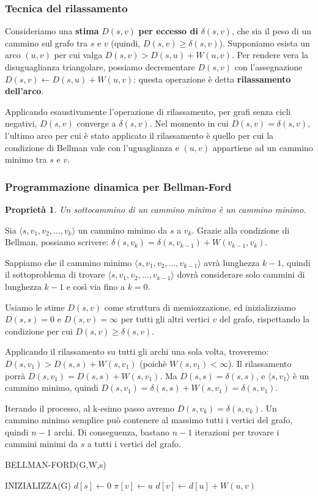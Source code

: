 \documentclass[11pt]{article}
\newtheorem*{proprietà}{Proprietà}
\begin{document}
\subsubsection{Tecnica del rilassamento}
Consideriamo una \textbf{stima} $D(s,v)$ \textbf{per eccesso di} $\delta(s,v)$, che sia il peso di un cammino sul grafo 
tra $s$ e $v$ (quindi, $D(s,v)\geq \delta(s,v)$).
Supponiamo esista un arco $(u,v)$ per cui valga $D(s,v)>D(s,u)+W(u,v)$. Per rendere vera la disuguaglianza triangolare, 
possiamo decrementare $D(s,v)$ con l'assegnazione $D(s,v)\gets D(s,u)+W(u,v)$: questa operazione è detta \textbf{rilassamento 
dell'arco}.

Applicando esaustivamente l'operazione di rilassamento, per grafi senza cicli negativi, $D(s,v)$ converge a $\delta(s,v)$.
Nel momento in cui $D(s,v)=\delta(s,v)$, l'ultimo arco per cui è stato applicato il rilassamento è quello per cui la condizione
di Bellman vale con l'uguaglianza e $(u,v)$ appartiene ad un cammino minimo tra $s$ e $v$. 
\subsubsection{Programmazione dinamica per Bellman-Ford}
\begin{proprietà}
    Un sottocammino di un cammino minimo è un cammino minimo.
\end{proprietà}
Sia $\langle s,v_1,v_2,\dots,v_k \rangle$ un cammino minimo da $s$ a $v_k$. Grazie alla condizione di Bellman, possiamo 
scrivere: $\delta(s,v_k)=\delta(s,v_{k-1})+W(v_{k-1},v_k)$.

Sappiamo che il cammino minimo $\langle s,v_1,v_2,\dots,v_{k-1} \rangle$ avrà lunghezza $k-1$, quindi il sottoproblema di 
trovare $\langle s,v_1,v_2,\dots,v_{k-1} \rangle$ dovrà considerare solo cammini di lunghezza $k-1$ e così via fino a $k=0$.

Usiamo le stime $D(s,v)$ come struttura di memiozzazione, ed inizializziamo $D(s,s)=0$ e $D(s,v)=\infty$ per tutti gli 
altri vertici $v$ del grafo, rispettando la condizione per cui $D(s,v)\geq \delta(s,v)$.

Applicando il rilassamento su tutti gli archi una sola volta, troveremo: $D(s,v_1)>D(s,s)+W(s,v_1)$ (poichè $W(s,v_1)<\infty$).
Il rilassamento porrà $D(s,v_1)=D(s,s)+W(s,v_1)$. Ma $D(s,s)=\delta(s,s)$, e $\langle s,v_1 \rangle$ è un cammino minimo, 
quindi $D(s,v_1)=\delta(s,s)+W(s,v_1)=\delta(s,v_1)$.  

Iterando il processo, al k-esimo passo avremo $D(s,v_k)=\delta(s,v_k)$.
Un cammino minimo semplice può contenere al massimo tutti i vertici del grafo, quindi $n-1$ archi. Di conseguenza, bastano 
$n-1$ iterazioni per trovare i cammini minimi da $s$ a tutti i vertici del grafo.
\begin{algorithm}
    \caption{BELLMAN-FORD(G,W,s)}
    \begin{algorithmic}
        \State INIZIALIZZA(G)
        \State $d[s]\gets 0$
                    \State $\pi[v]\gets u$
                    \State $d[v]\gets d[u]+W(u,v)$
                \EndIf 
            \EndFor 
        \EndFor
    \end{algorithmic}
\end{algorithm}
\end{document}
